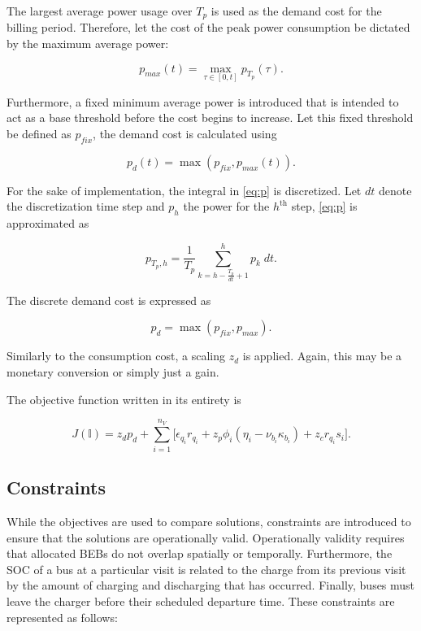 \documentclass[ee,thesis]{usuthesis}
\newcommand{\I}{\mathbb{I}}                 %
\begin{document}
The largest average power usage over \(T_p\) is used as the demand cost for the billing period. Therefore, let the cost of
the peak power consumption be dictated by the maximum average power:

\begin{equation}
\label{eq:pmax}
p_{max}(t) = \max\limits_{\tau \in [0,t]}p_{T_p}(\tau)\text{.}
\end{equation}

Furthermore, a fixed minimum average power is introduced that is intended to act as a base threshold before the cost
begins to increase. Let this fixed threshold be defined as \(p_{fix}\), the demand cost is calculated using

\begin{equation}
\label{eq:pdem}
p_d(t) = \max(p_{fix},p_{max}(t))\text{.}
\end{equation}

For the sake of implementation, the integral in \ref{eq:p} is discretized. Let \(dt\) denote the discretization time step and
\(p_h\) the power for the \(h^{\text{th}}\) step, \ref{eq:p} is approximated as

\begin{equation}
p_{T_p,h} = \frac{1}{T_p} \sum_{k = h-\frac{T_p}{dt}+1}^h p_k\; dt\text{.}
\end{equation}

The discrete demand cost is expressed as

\begin{equation}
\label{eq:pd-dis}
  p_d = \max(p_{fix}, p_{max})\text{.}
\end{equation}

Similarly to the consumption cost, a scaling \(z_d\) is applied. Again, this may be a monetary conversion or simply just a
gain.

The objective function written in its entirety is

\begin{equation}
\label{eq:objective-function}
  J(\I) = z_d p_d + \sum_{i=1}^{n_V} \Big[ \epsilon_{q_i}r_{q_i} + z_p \phi_i(\eta_i - \nu_{b_i} \kappa_{b_i}) + z_c r_{q_i} s_i \Big] \text{.}
\end{equation}

\subsection{Constraints}
\label{sec:sa-constraints}
While the objectives are used to compare solutions, constraints are introduced to ensure that the solutions are
operationally valid. Operationally validity requires that allocated BEBs do not overlap spatially or temporally.
Furthermore, the SOC of a bus at a particular visit is related to the charge from its previous visit by the amount of
charging and discharging that has occurred. Finally, buses must leave the charger before their scheduled departure time.
These constraints are represented as follows:
\end{document}
